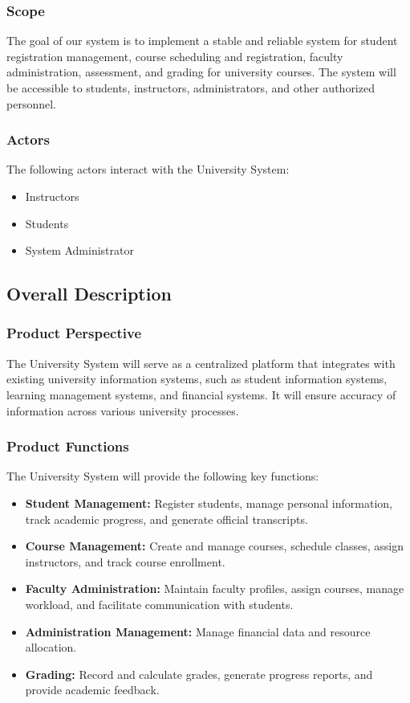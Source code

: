 \documentclass[12pt]{article}
\begin{document}
	\subsubsection{Scope}
	The goal of our system is to implement a stable and reliable system for student registration management, course scheduling and registration, faculty administration, assessment, and grading for university courses. The system will be accessible to students, instructors, administrators, and other authorized personnel.
	
	\subsubsection{Actors}
	The following actors interact with the University System:
	\begin{itemize}
		\item Instructors
		\item Students
		\item System Administrator
	\end{itemize}
	
	\subsection{Overall Description}
	
	\subsubsection{Product Perspective}
	The University System will serve as a centralized platform that integrates with existing university information systems, such as student information systems, learning management systems, and financial systems. It will ensure accuracy of information across various university processes.
	
	\subsubsection{Product Functions}
	The University System will provide the following key functions:
	\begin{itemize}
		\item \textbf{Student Management:} Register students, manage personal information, track academic progress, and generate official transcripts.
		\item \textbf{Course Management:} Create and manage courses, schedule classes, assign instructors, and track course enrollment.
		\item \textbf{Faculty Administration:} Maintain faculty profiles, assign courses, manage workload, and facilitate communication with students.
		\item \textbf{Administration Management:} Manage financial data and resource allocation.
		\item \textbf{Grading:} Record and calculate grades, generate progress reports, and provide academic feedback.
	\end{itemize}
	
\end{document}

